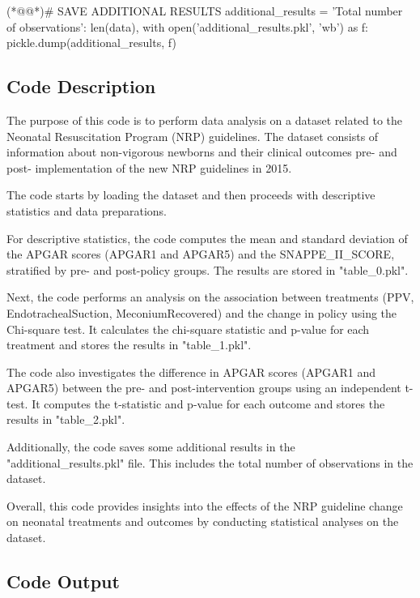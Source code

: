 \documentclass[11pt]{article}
\begin{document}
\begin{python}
(*@@*)# SAVE ADDITIONAL RESULTS
additional_results = {
    'Total number of observations': len(data),
}
with open('additional_results.pkl', 'wb') as f:
    pickle.dump(additional_results, f)

\end{python}

\subsection{Code Description}

The purpose of this code is to perform data analysis on a dataset related to the Neonatal Resuscitation Program (NRP) guidelines. The dataset consists of information about non-vigorous newborns and their clinical outcomes pre- and post- implementation of the new NRP guidelines in 2015. 

The code starts by loading the dataset and then proceeds with descriptive statistics and data preparations. 

For descriptive statistics, the code computes the mean and standard deviation of the APGAR scores (APGAR1 and APGAR5) and the SNAPPE\_II\_SCORE, stratified by pre- and post-policy groups. The results are stored in "table\_0.pkl".

Next, the code performs an analysis on the association between treatments (PPV, EndotrachealSuction, MeconiumRecovered) and the change in policy using the Chi-square test. It calculates the chi-square statistic and p-value for each treatment and stores the results in "table\_1.pkl".

The code also investigates the difference in APGAR scores (APGAR1 and APGAR5) between the pre- and post-intervention groups using an independent t-test. It computes the t-statistic and p-value for each outcome and stores the results in "table\_2.pkl".

Additionally, the code saves some additional results in the "additional\_results.pkl" file. This includes the total number of observations in the dataset.

Overall, this code provides insights into the effects of the NRP guideline change on neonatal treatments and outcomes by conducting statistical analyses on the dataset.

\subsection{Code Output}\hypertarget{file-table-0-pkl}{}
\end{document}
